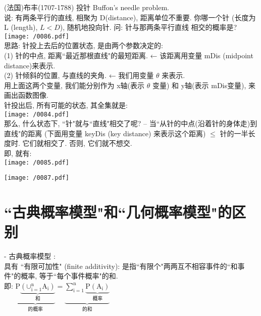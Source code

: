 \documentclass[UTF8]{ctexart}
\begin{document}
	
	
	\begin{myEnvSample}
		(法国)布丰(1707-1788) 投针 Buffon's needle problem. \\
		说: 有两条平行的直线, 相聚为 D(distance), 距离单位不重要. 你哪一个针 (长度为 L (length), $L<D$), 随机地投向针. 问: 针与那两条平行直线 相交的概率是? \\
		
		\texttt{[image: /0086.pdf]} \\
		
		思路: 针投上去后的位置状态, 是由两个参数决定的: \\
		(1) 针的中点, 距离``最近那根直线"的最短距离. ← 该距离用变量 mDis (midpoint distance)来表示. \\
		(2) 针倾斜的位置, 与直线的夹角. ← 我们用变量 $\theta$ 来表示.  \\
		用上面这两个变量, 我们能分别作为 x轴(表示 $\theta$ 变量) 和 y轴(表示 mDis变量), 来画出函数图像. \\
		
		针投出后, 所有可能的状态, 其全集就是: \\
		\texttt{[image: /0084.pdf]} \\
		
		那么, 什么状态下, ``针"就与``直线"相交了呢? -- 当``从针的中点(沿着针的身体走)到直线"的距离 (下面用变量 keyDis (key distance) 来表示这个距离) $\leq$ 针的一半长度时. 它们就相交了. 否则, 它们就不想交. \\
		即, 就有: \\	
		\texttt{[image: /0085.pdf]}
		
		\texttt{[image: /0087.pdf]}
	\end{myEnvSample} 
	
	
	
	
	
	
	\section{``古典概率模型"和``几何概率模型"的区别}
	
	- 古典概率模型 : \\
	具有 ``有限可加性" (finite additivity): 是指``有限个"两两互不相容事件的``和事件"的概率, 等于``每个事件概率"的和. \\
	即: $
	\underset{\text{的概率}}{\underbrace{\text{P}\underset{\text{和}}{\underbrace{\left( \text{∪}_{\text{i}=1}^{\text{n}}\text{A}_{\text{i}} \right) }}}}=\underset{\text{的和}}{\underbrace{\sum_{\text{i}=1}^{\text{n}}{\underset{\text{概率}}{\underbrace{\text{P}\left( \text{A}_{\text{i}} \right) }}}}}
	$ \\
	\\
	
\end{document}
